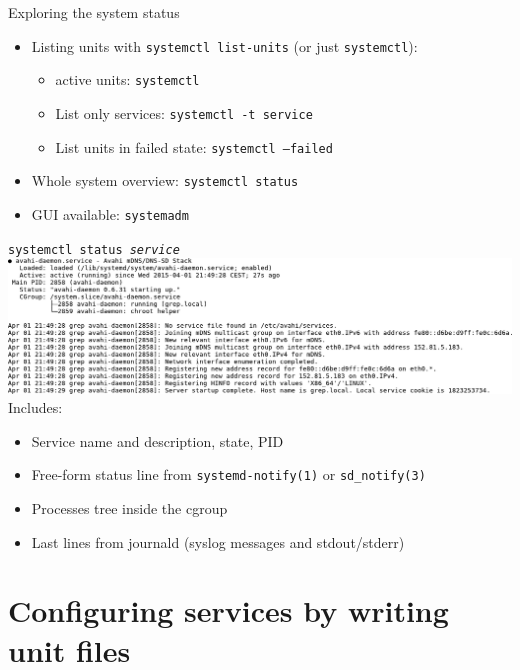 \documentclass[11pt,final,usepdftitle=false]{beamer}
\begin{document}
\begin{frame}{Exploring the system status}
\begin{itemize}
\item Listing units with \texttt{systemctl list-units} (or just \texttt{systemctl}):
\begin{itemize}
\item active units: \texttt{systemctl}
\hhbr
\item List only services: \texttt{systemctl -t service}
\hhbr
\item List units in failed state: \texttt{systemctl --failed}
\end{itemize}
\hbr
\item Whole system overview: \texttt{systemctl status}
\hbr
\item GUI available: \texttt{systemadm}
\end{itemize}
\end{frame}

\begin{frame}{\texttt{systemctl status \textsl{\tt service}}}
\br
\includegraphics[width=1.5\textwidth]{figs/systemctl-status}
\hbr
Includes:
\begin{itemize}
\item Service name and description, state, PID
\item Free-form status line from \texttt{systemd-notify(1)} or \texttt{sd\_notify(3)}
\item Processes tree inside the cgroup
\item Last lines from journald (syslog messages and stdout/stderr)
\end{itemize}
\end{frame}

\section{Configuring services by writing unit files}
\end{document}
